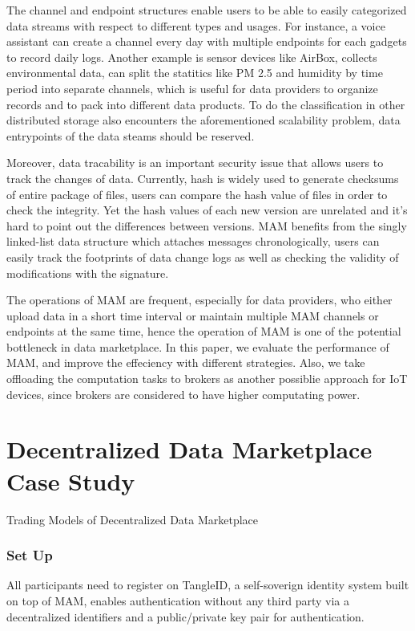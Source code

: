 \documentclass[conference]{IEEEtran}
\begin{document}
The channel and endpoint structures enable users to be able to easily categorized data streams with respect to different types and usages. For instance, a voice assistant can create a channel every day with multiple endpoints for each gadgets to record daily logs. Another example is sensor devices like AirBox\cite{LASS}, collects environmental data, can split the statitics like PM 2.5 and humidity by time period into separate channels, which is useful for data providers to organize records and to pack into different data products. To do the classification in other distributed storage also encounters the aforementioned scalability problem, data entrypoints of the data steams should be reserved.    

Moreover, data tracability is an important security issue that allows users to track the changes of data. Currently, hash is widely used to generate checksums of entire package of files, users can compare the hash value of files in order to check the integrity. Yet the hash values of each new version are unrelated and it's hard to point out the differences between versions. MAM benefits from the singly linked-list data structure which attaches messages chronologically, users can easily track the footprints of data change logs as well as checking the validity of modifications with the signature.

The operations of MAM are frequent, especially for data providers, who either upload data in a short time interval or maintain multiple MAM channels or endpoints at the same time, hence the operation of MAM is one of the potential bottleneck in data marketplace. In this paper, we evaluate the performance of MAM, and improve the effeciency with different strategies. Also, we take offloading the computation tasks to brokers as another possiblie approach for IoT devices, since brokers are considered to have higher computating power.

\section{Decentralized Data Marketplace Case Study}
Trading Models of Decentralized Data Marketplace
\subsubsection{Set Up}
All participants need to register on TangleID\cite{TangleID}, a self-soverign identity system built on top of MAM, enables authentication without any third party via a decentralized identifiers and a public/private key pair for authentication. 
\end{document}
